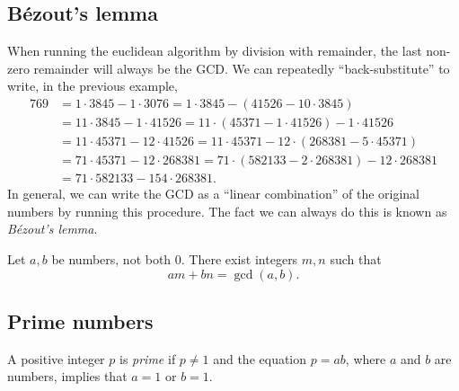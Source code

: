 \subsection{B\'{e}zout's lemma}

When running the euclidean algorithm by division with remainder, the last non-zero remainder will always be the GCD. We can repeatedly ``back-substitute'' to write, in the previous example,
\begin{align*}
769 &= 1\cdot 3845 - 1\cdot 3076 = 1\cdot 3845 - (41526 - 10\cdot 3845) \\
&= 11\cdot 3845 - 1\cdot 41526 = 11\cdot (45371 - 1\cdot 41526) - 1\cdot 41526 \\
&= 11\cdot 45371 - 12\cdot 41526 = 11\cdot 45371 - 12\cdot (268381 - 5\cdot 45371) \\
&= 71\cdot 45371 - 12\cdot 268381 = 71\cdot (582133 - 2\cdot 268381) - 12\cdot 268381 \\
&= 71\cdot 582133 - 154\cdot 268381.
\end{align*}
In general, we can write the GCD as a ``linear combination'' of the original numbers by running this procedure. The fact we can always do this is known as \emph{B\'{e}zout's lemma}.
\begin{lemma}[B\'{e}zout]
Let $a,b$ be numbers, not both $0$. There exist integers $m,n$ such that
\begin{equation*}
am + bn = \gcd(a,b).
\end{equation*}
\end{lemma}


\subsection{Prime numbers}

A positive integer $p$ is \emph{prime} if $p\neq 1$ and the equation $p = ab$, where $a$ and $b$ are numbers, implies that $a = 1$ or $b = 1$.